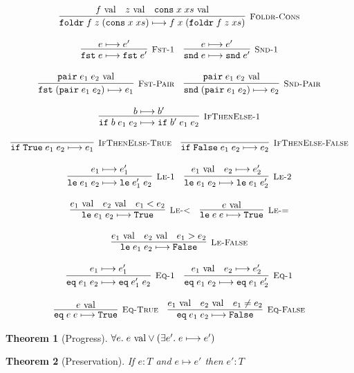 \documentclass[10pt]{article}
\newtheorem{theorem}{Theorem}
\newcommand{\ttt}[1]{\texttt{#1}}
\newcommand{\reduces}{\ensuremath{\longmapsto}}
\newcommand{\val}{\textnormal{ val}}
\newcommand{\True}{\ttt{True}}
\newcommand{\False}{\ttt{False}}
\newcommand{\cons}{\ttt{cons}}
\newcommand{\foldr}{\ttt{foldr}}
\newcommand{\pair}{\ttt{pair}}
\newcommand{\fst}{\ttt{fst}}
\newcommand{\snd}{\ttt{snd}}
\newcommand{\ite}{\ttt{if}}
\newcommand{\lesseq}{\ttt{le}}
\newcommand{\eq}{\ttt{eq}}
\newcommand{\labinfer} [3] [] {\infer[{\small\textsc{#1}}]{#2}{#3}}
\begin{document}
\[\begin{array}{cc}
    \labinfer[Foldr-Cons]{\foldr\; f\; z\; (\cons\; x\; xs) \reduces f\; x\; (\foldr\; f\; z\; xs)}{f \val & z \val & \cons\; x\; xs \val}
    \\\\
    \labinfer[Fst-1]{\fst\; e \reduces \fst\; e'}{e \reduces e'}
    ~~~
    \labinfer[Snd-1]{\snd\; e \reduces \snd\; e'}{e \reduces e'}
    \\\\
    \labinfer[Fst-Pair]{\fst\; (\pair\; e_1\; e_2) \reduces e_1}{\pair\; e_1\; e_2 \val}
    ~~~
    \labinfer[Snd-Pair]{\snd\; (\pair\; e_1\; e_2) \reduces e_2}{\pair\; e_1\; e_2 \val}
    \\\\
    \labinfer[IfThenElse-1]{\ite\; b\; e_1\; e_2 \reduces \ite\; b'\; e_1\; e_2}{b \reduces b'}
    \\\\
    \labinfer[IfThenElse-True]{\ite\; \True\; e_1\; e_2 \reduces e_1}{}
    ~~~
    \labinfer[IfThenElse-False]{\ite\; \False\; e_1\; e_2 \reduces e_2}{}
    \\\\
    \labinfer[Le-1]{\lesseq\; e_1\; e_2 \reduces \lesseq\; e_1'\; e_2}{e_1 \reduces e_1'}
    ~~~
    \labinfer[Le-2]{\lesseq\; e_1\; e_2 \reduces \lesseq\; e_1\; e_2'}{e_1 \val & e_2 \reduces e_2'}
    \\\\
    \labinfer[Le-<]{\lesseq\; e_1\; e_2 \reduces \True}{e_1 \val & e_2 \val & e_1 < e_2}
    ~~~
    \labinfer[Le-=]{\lesseq\; e\; e \reduces \True}{e \val}
    \\\\
    \labinfer[Le-False]{\lesseq\; e_1\; e_2 \reduces \False}{e_1 \val & e_2 \val & e_1 > e_2}
    \\\\
    \labinfer[Eq-1]{\eq\; e_1\; e_2 \reduces \eq\; e_1'\; e_2}{e_1 \reduces e_1'}
    ~~~
    \labinfer[Eq-1]{\eq\; e_1\; e_2 \reduces \eq\; e_1\; e_2'}{e_1 \val & e_2 \reduces e_2'}
    \\\\
    \labinfer[Eq-True]{\eq\; e\; e \reduces \True}{e \val}
    ~~~
    \labinfer[Eq-False]{\eq\; e_1\; e_2 \reduces \False}{e_1 \val & e_2 \val & e_1 \neq e_2}
    
  \end{array}
\]

\begin{theorem}[Progress]
  $\forall e.\; e \val \lor (\exists e'.\; e \reduces e')$
\end{theorem}

\begin{theorem}[Preservation]
  If $e : T$ and $e \reduces e'$ then $e' : T$
\end{theorem}
\end{document}
